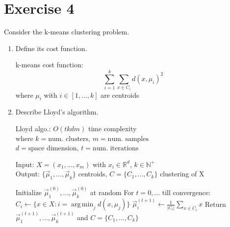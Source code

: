 \documentclass[a4paper,11pt,oneside]{book}
\DeclareMathOperator*{\argmin}{arg\,min}
\begin{document}
\section{Exercise 4}
    Consider the k-means clustering problem.
    \begin{enumerate}
        \item Define its cost function.
        \begin{solution}
            k-means cost function:
            $$\sum_{i=1}^k \sum_{x \in C_i} d(x, \mu_i)^2$$
            where $\mu_i$ with $i \in [1,...,k]$ are centroids
            \end{solution}
        \item Describe Lloyd's algorithm.
        \begin{solution}
            Lloyd algo.: $O(tkdm)$ time complexity\\
            where $k = \text{num. clusters}$, $m = \text{num. samples}$\\
            $d = \text{space dimension}$, $t = \text{num. iterations}$
            
            Input: $X = (x_1,...,x_m)$ with $x_i \in \mathbb{R}^d$, $k \in \mathbb{N}^+$\\
            Output: $\{\vec{\mu}_1,...,\vec{\mu}_k\}$ centroids, $C = \{C_1,...,C_k\}$ clustering of X
            
            \begin{algorithmic}[1]
            \State Initialize $\vec{\mu}_1^{(0)},...,\vec{\mu}_k^{(0)}$ at random 
            \State For $t = 0,...$ till convergence: 
               \State $C_i \gets \{x \in X : i = \argmin_j d(x,\mu_j)\}$
            \EndFor
               \State $\vec{\mu}_i^{(t+1)} \gets \frac{1}{|C_i|}\sum_{x \in C_i} x$ 
            \EndFor
               \State Return $\vec{\mu}_1^{(t+1)},...,\vec{\mu}_k^{(t+1)}$ and $C = \{C_1,...,C_k\}$
            \EndIf
            \end{algorithmic}
            

\end{solution}
\end{enumerate}
\end{document}

